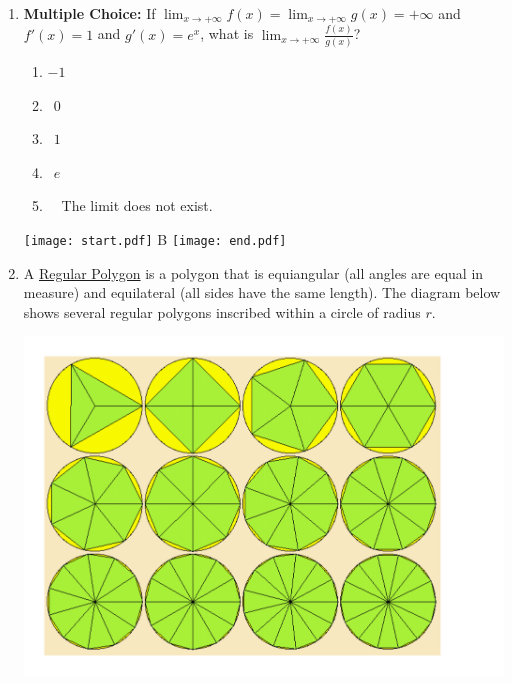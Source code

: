 \documentclass[12pt]{article}
\begin{document}
\begin{enumerate}
\item {\bf Multiple Choice:} If $\displaystyle \lim_{x\rightarrow +\infty} f(x) =
\lim_{x\rightarrow +\infty} g(x) = +\infty$ and $f'(x)=1$ and $g'(x)=e^x$, what is 
$\displaystyle \lim_{x\rightarrow +\infty}\frac{f(x)}{g(x)}$?

\begin{enumerate}

\item $-1$

\item $\ \ 0$

\item $\ \ 1$

\item $\ \ e$

\item \ \ The limit does not exist.

\end{enumerate}

\texttt{[image: start.pdf]}
{{B}}
\texttt{[image: end.pdf]}


\item A \underline{Regular Polygon} is a polygon that is equiangular (all angles are equal in measure) and equilateral (all sides have the same length).  The diagram below shows several regular polygons inscribed within a circle of radius $r$.

\begin{center}

\includegraphics[scale=0.4]{Inscribed.pdf}

\end{center}

\begin{enumerate}


\end{enumerate}
\end{enumerate}
\end{document}
